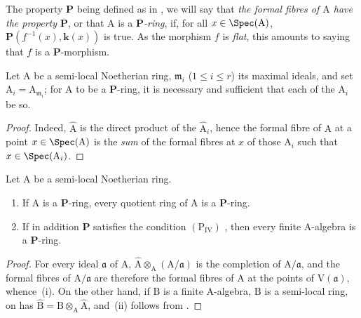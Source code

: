 
The property $\boldsymbol{P}$ being defined as in , we will say that \emph{the formal fibres of $\mathrm{A}$ have the property $\boldsymbol{P}$}, or that $\mathrm{A}$ is a \emph{$\boldsymbol{P}$-ring}, if, for all $x\in\Spec(\mathrm{A})$, $\boldsymbol{P}(f^{-1}(x),\boldsymbol{k}(x))$ is true.
As the morphism $f$ is \emph{flat}, this amounts to saying that $f$ is a $\boldsymbol{P}$-morphism.

\begin{proposition}[7.3.14]
\label{IV.7.3.14}
Let $\mathrm{A}$ be a semi-local Noetherian ring, $\mathfrak{m}_i$ ($1\leqslant i\leqslant r$) its maximal ideals, and set $\mathrm{A}_i=\mathrm{A}_{\mathfrak{m}_i}$; for $\mathrm{A}$ to be a $\boldsymbol{P}$-ring, it is necessary and sufficient that each of the $\mathrm{A}_i$ be so.
\end{proposition}

\begin{proof}
Indeed, $\widehat{\mathrm{A}}$ is the direct product of the $\widehat{\mathrm{A}}_i$, hence the formal fibre of $\mathrm{A}$ at a point $x\in\Spec(\mathrm{A})$ is the \emph{sum} of the formal fibres at $x$ of those $\mathrm{A}_i$ such that $x\in\Spec(\mathrm{A}_i)$.
\end{proof}

\begin{proposition}[7.3.15]
\label{IV.7.3.15}
Let $\mathrm{A}$ be a semi-local Noetherian ring.
\begin{enumerate}[label=\emph{\roman*)}]
  \item If $\mathrm{A}$ is a $\boldsymbol{P}$-ring, every quotient ring of $\mathrm{A}$ is a $\boldsymbol{P}$-ring.
  \item If in addition $\boldsymbol{P}$ satisfies the condition $(\mathrm{P_{IV}})$ , then every finite A-algebra is a $\boldsymbol{P}$-ring.
\end{enumerate}
\end{proposition}

\begin{proof}
For every ideal $\mathfrak{a}$ of $\mathrm{A}$, $\widehat{\mathrm{A}}\otimes_\mathrm{A}(\mathrm{A}/\mathfrak{a})$ is the completion of $\mathrm{A}/\mathfrak{a}$, and the formal fibres of $\mathrm{A}/\mathfrak{a}$ are therefore the formal fibres of $\mathrm{A}$ at the points of $\mathrm{V}(\mathfrak{a})$, whence~(i).
On the other hand, if $\mathrm{B}$ is a finite A-algebra, $\mathrm{B}$ is a semi-local ring, on has $\widehat{\mathrm{B}}=\mathrm{B}\otimes_\mathrm{A}\widehat{\mathrm{A}}$, and~(ii) follows from .
\end{proof}

